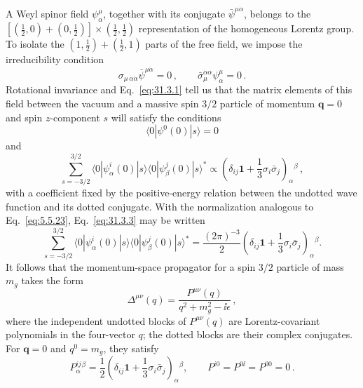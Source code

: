 A Weyl spinor field \(\psi^\mu_\alpha\), together with its conjugate
\(\bar\psi^{\mu\dot\alpha}\), belongs to the
\([(\frac12,0)+(0,\frac12)]\mathbin{\times}(\frac12,\frac12)\)
representation of the homogeneous Lorentz group. To isolate the
\((1,\frac12)+(\frac12,1)\) parts of the free field, we impose the
irreducibility condition
\begin{equation}
  \sigma_{\mu\,\alpha\dot\alpha}\bar\psi^{\mu\dot\alpha}=0\,,
  \qquad
  \bar\sigma_\mu^{\dot\alpha\alpha}\psi^\mu_\alpha=0\,.
  \tag{31.3.1}\label{eq:31.3.1}
\end{equation}
Rotational invariance and Eq.~\eqref{eq:31.3.1} tell us that the matrix
elements of this field between the vacuum and a massive spin \(3/2\)
particle of momentum \(\boldsymbol q=0\) and spin \(z\)-component \(s\)
will satisfy the conditions
\begin{equation}
  \langle0|\psi^0(0)|s\rangle=0
  \tag{31.3.2}\label{eq:31.3.2}
\end{equation}
and
\begin{equation}
  \sum_{s=-3/2}^{3/2}
  \langle0|\psi^i_\alpha(0)|s\rangle
  \langle0|\psi^j_\beta(0)|s\rangle^*
  \propto
  \left(\delta_{ij}\mathbf{1}
        +\frac13\sigma_i\bar\sigma_j\right)_{\alpha}{}^\beta\,,
  \tag{31.3.3}\label{eq:31.3.3}
\end{equation}
with a coefficient fixed by the positive-energy relation between the
undotted wave function and its dotted conjugate. With the normalization
analogous to Eq.~\eqref{eq:5.5.23}, Eq.~\eqref{eq:31.3.3} may be written
\begin{equation}
  \sum_{s=-3/2}^{3/2}
  \langle0|\psi^i_\alpha(0)|s\rangle
  \langle0|\psi^j_\beta(0)|s\rangle^*
  =\frac{(2\pi)^{-3}}{2}
  \left(\delta_{ij}\mathbf{1}
        +\frac13\sigma_i\bar\sigma_j\right)_{\alpha}{}^\beta .
  \tag{31.3.4}\label{eq:31.3.4}
\end{equation}
It follows that the momentum-space propagator for a spin \(3/2\) particle
of mass \(m_g\) takes the form
\begin{equation}
  \Delta^{\mu\nu}(q)
  =\frac{P^{\mu\nu}(q)}{q^2+m_g^2-\ii\epsilon}\,,
  \tag{31.3.5}\label{eq:31.3.5}
\end{equation}
where the independent undotted blocks of \(P^{\mu\nu}(q)\) are
Lorentz-covariant polynomials in the four-vector \(q\); the dotted blocks
are their complex conjugates.  For \(\boldsymbol q=0\) and \(q^0=m_g\),
they satisfy
\begin{equation}
  P^{ij}_{\alpha}{}^\beta
  =\frac12
   \left(\delta_{ij}\mathbf{1}
         +\frac13\sigma_i\bar\sigma_j\right)_{\alpha}{}^\beta,
  \qquad
  P^{i0}=P^{0\ii}=P^{00}=0\,.
  \tag{31.3.6}\label{eq:31.3.6}
\end{equation}

